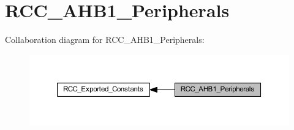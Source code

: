 \hypertarget{group___r_c_c___a_h_b1___peripherals}{}\section{R\+C\+C\+\_\+\+A\+H\+B1\+\_\+\+Peripherals}
\label{group___r_c_c___a_h_b1___peripherals}
Collaboration diagram for R\+C\+C\+\_\+\+A\+H\+B1\+\_\+\+Peripherals\+:\nopagebreak
\begin{figure}[H]
\begin{center}
\leavevmode
\includegraphics[width=350pt]{group___r_c_c___a_h_b1___peripherals}
\end{center}
\end{figure}
